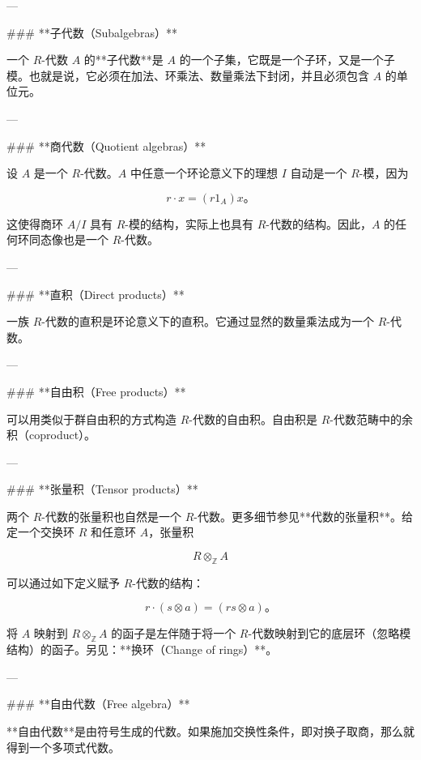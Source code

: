 ---

### **子代数（Subalgebras）**

一个 $R$-代数 $A$ 的**子代数**是 $A$ 的一个子集，它既是一个子环，又是一个子模。也就是说，它必须在加法、环乘法、数量乘法下封闭，并且必须包含 $A$ 的单位元。

---

### **商代数（Quotient algebras）**

设 $A$ 是一个 $R$-代数。$A$ 中任意一个环论意义下的理想 $I$ 自动是一个 $R$-模，因为

$$
r \cdot x = (r 1_A) x。
$$

这使得商环 $A / I$ 具有 $R$-模的结构，实际上也具有 $R$-代数的结构。因此，$A$ 的任何环同态像也是一个 $R$-代数。

---

### **直积（Direct products）**

一族 $R$-代数的直积是环论意义下的直积。它通过显然的数量乘法成为一个 $R$-代数。

---

### **自由积（Free products）**

可以用类似于群自由积的方式构造 $R$-代数的自由积。自由积是 $R$-代数范畴中的余积（coproduct）。

---

### **张量积（Tensor products）**

两个 $R$-代数的张量积也自然是一个 $R$-代数。更多细节参见**代数的张量积**。给定一个交换环 $R$ 和任意环 $A$，张量积

$$
R \otimes_{\mathbb{Z}} A
$$

可以通过如下定义赋予 $R$-代数的结构：

$$
r \cdot (s \otimes a) = (rs \otimes a)。
$$

将 $A$ 映射到 $R \otimes_{\mathbb{Z}} A$ 的函子是左伴随于将一个 $R$-代数映射到它的底层环（忽略模结构）的函子。另见：**换环（Change of rings）**。

---

### **自由代数（Free algebra）**

**自由代数**是由符号生成的代数。如果施加交换性条件，即对换子取商，那么就得到一个多项式代数。
